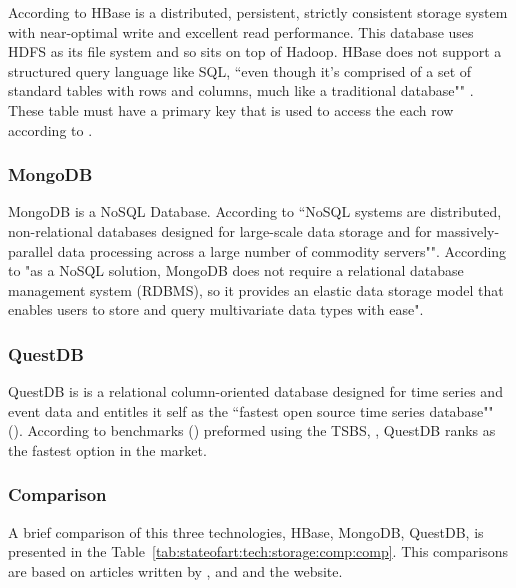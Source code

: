 According to \cite{george2011hbase} HBase is a distributed, persistent, strictly consistent storage system with near-optimal write and excellent read performance. This database uses \gls{HDFS} as its file system and so sits on top of Hadoop.
HBase does not support a structured query language like SQL, ``even though it's comprised of a set of standard tables with rows and columns, much like a traditional database"" \parencite{ibm-hbase}. These table must have a primary key that is used to access the each row according to \cite{ibm-hbase}.

\subsubsection{MongoDB}
\label{subsubsec:stateofart:tech:storage:mongodb}

MongoDB is a NoSQL Database. According to \cite{moniruzzaman2013nosql} ``NoSQL systems are distributed, non-relational databases designed for large-scale data storage and for massively-parallel data processing across a large number of commodity servers"".
According to \cite{ibm-mongo,} "as a NoSQL solution, MongoDB does not require a relational database management system (RDBMS), so it provides an elastic data storage model that enables users to store and query multivariate data types with ease".

\subsubsection{QuestDB}
\label{subsubsec:stateofart:tech:storage:questdb}

QuestDB is is a relational column-oriented database designed for time series and event data and entitles it self as the ``fastest open source time series database"" (\cite{questdb}).
According to benchmarks (\cite{quest-bench}) preformed using the \gls{TSBS}, \cite{TSBS}, QuestDB ranks as the fastest option in the market.

\subsubsection{Comparison}
\label{subsubsec:stateofart:tech:storage:comp}

A brief comparison of this three technologies, HBase, MongoDB, QuestDB, is presented in the Table~\ref{tab:stateofart:tech:storage:comp:comp}. This comparisons are based on articles written by \cite{george2011hbase}, \cite{moniruzzaman2013nosql} and \cite{davoudian2018survey} and the \cite{questdb} website.

